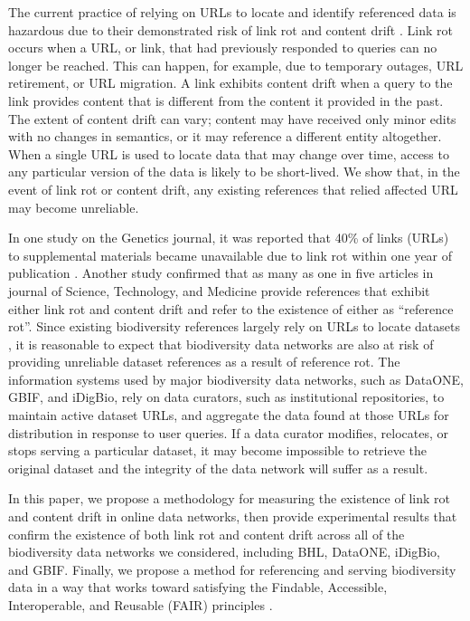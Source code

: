 The current practice of relying on URLs to locate and identify referenced data is hazardous due to their demonstrated risk of link rot and content drift \citep{Klein_2014}. Link rot occurs when a URL, or link, that had previously responded to queries can no longer be reached. This can happen, for example, due to temporary outages, URL retirement, or URL migration. A link exhibits content drift when a query to the link provides content that is different from the content it provided in the past. The extent of content drift can vary; content may have received only minor edits with no changes in semantics, or it may reference a different entity altogether. When a single URL is used to locate data that may change over time, access to any particular version of the data is likely to be short-lived. We show that, in the event of link rot or content drift, any existing references that relied affected URL may become unreliable.

In one study on the Genetics journal, it was reported that 40\% of links (URLs) to supplemental materials became unavailable due to link rot within one year of publication \citep{Vision_2010}. Another study \citep{Klein_2014} confirmed that as many as one in five articles in journal of Science, Technology, and Medicine provide references that exhibit either link rot and content drift and refer to the existence of either as “reference rot”. Since existing biodiversity references largely rely on URLs to locate datasets \citep{gbif_2019,idigbio_2016,dataone_2012}, it is reasonable to expect that biodiversity data networks are also at risk of providing unreliable dataset references as a result of reference rot. The information systems used by major biodiversity data networks, such as DataONE, GBIF, and iDigBio, rely on data curators, such as institutional repositories, to maintain active dataset URLs, and aggregate the data found at those URLs for distribution in response to user queries. If a data curator modifies, relocates, or stops serving a particular dataset, it may become impossible to retrieve the original dataset and the integrity of the data network will suffer as a result.

In this paper, we propose a methodology for measuring the existence of link rot and content drift in online data networks, then provide experimental results that confirm the existence of both link rot and content drift across all of the biodiversity data networks we considered, including BHL, DataONE, iDigBio, and GBIF. Finally, we propose a method for referencing and serving biodiversity data in a way that works toward satisfying the Findable, Accessible, Interoperable, and Reusable (FAIR) principles \citep{Wilkinson_2016}.


